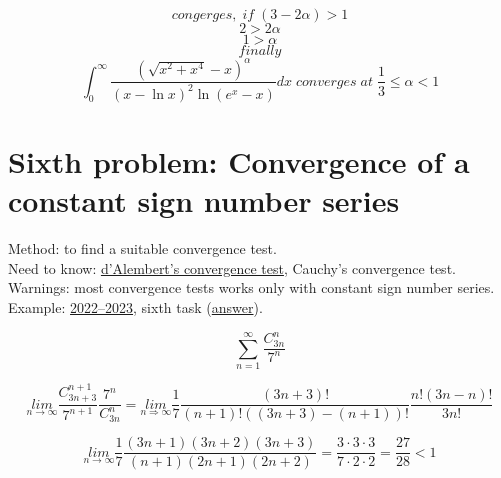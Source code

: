 \documentclass{article}
\begin{document}
\begin{equation*}
    congerges, \; if \; (3-2\alpha)>1
\end{equation*}
\begin{equation*}
    2 > 2 \alpha
\end{equation*}
\begin{equation}
    1 > \alpha
\end{equation}
\begin{equation*}
    finally
\end{equation*}
\begin{equation}
    \int_{0}^{\infty} \frac{(\sqrt{x^2+x^4}-x)^\alpha }{(x- \ln x)^2 \ln (e^x-x)} dx \; converges \; at \; \frac{1}{3} \leq \alpha < 1
\end{equation}


\newpage
\section{Sixth problem: Convergence of a constant sign number series}
Method: to find a suitable convergence test.\\
Need to know: \hyperlink{6.1}{d'Alembert's convergence test}, Cauchy's convergence test.\\
Warnings: most convergence tests works only with constant sign number series.\\
Example: \href{https://old.mipt.ru/education/chair/mathematics/exams/exams/2022-23/%D0%9C%D0%90%D0%98%D0%B8%D0%A0_%D0%92_23.pdf}{2022–2023}, sixth task (\href{https://old.mipt.ru/education/chair/mathematics/exams/exams/2022-23/%D0%9C%D0%90%D0%98%D0%B8%D0%A0_%D0%92_23%D0%BE%D1%82%D0%B2%D0%B5%D1%82%D1%8B.pdf}{answer}).

\begin{equation}
    \sum_{n=1}^{\infty} \frac{C_{3n}^n}{7^n}
\end{equation}

\begin{equation*}
    \underset{n \rightarrow \infty}{lim} \frac{C_{3n+3}^{n+1}}{7^{n+1}} \frac{7^n}{C_{3n}^{n}} = \underset{n \Rightarrow \infty}{lim} \frac{1}{7} \frac{(3n+3)!}{(n+1)!((3n+3)-(n+1))!} \frac{n!(3n-n)!}{3n!}
\end{equation*}

\begin{equation*}
    \underset{n \rightarrow \infty}{lim} \frac{1}{7} \frac{(3n+1)(3n+2)(3n+3)}{(n+1)(2n+1)(2n+2)} = \frac{3 \cdot 3 \cdot 3}{7 \cdot 2 \cdot 2} = \frac{27}{28} < 1
\end{equation*}
\end{document}
